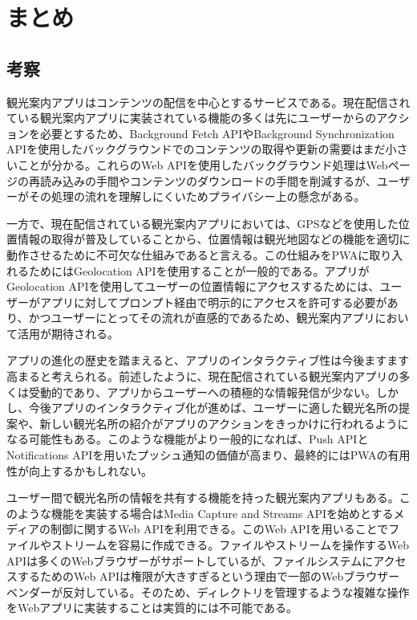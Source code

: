 \section{まとめ}
\label{section:まとめ}
\subsection{考察}
\label{subsection:考察}
観光案内アプリはコンテンツの配信を中心とするサービスである。現在配信されている観光案内アプリに実装されている機能の多くは先にユーザーからのアクションを必要とするため、Background Fetch APIやBackground Synchronization APIを使用したバックグラウンドでのコンテンツの取得や更新の需要はまだ小さいことが分かる。これらのWeb APIを使用したバックグラウンド処理はWebページの再読み込みの手間やコンテンツのダウンロードの手間を削減するが、ユーザーがその処理の流れを理解しにくいためプライバシー上の懸念がある。

一方で、現在配信されている観光案内アプリにおいては、GPSなどを使用した位置情報の取得が普及していることから、位置情報は観光地図などの機能を適切に動作させるために不可欠な仕組みであると言える。この仕組みをPWAに取り入れるためにはGeolocation APIを使用することが一般的である。アプリがGeolocation APIを使用してユーザーの位置情報にアクセスするためには、ユーザーがアプリに対してプロンプト経由で明示的にアクセスを許可する必要があり、かつユーザーにとってその流れが直感的であるため、観光案内アプリにおいて活用が期待される。

アプリの進化の歴史を踏まえると、アプリのインタラクティブ性は今後ますます高まると考えられる。前述したように、現在配信されている観光案内アプリの多くは受動的であり、アプリからユーザーへの積極的な情報発信が少ない。しかし、今後アプリのインタラクティブ化が進めば、ユーザーに適した観光名所の提案や、新しい観光名所の紹介がアプリのアクションをきっかけに行われるようになる可能性もある。このような機能がより一般的になれば、Push APIとNotifications APIを用いたプッシュ通知の価値が高まり、最終的にはPWAの有用性が向上するかもしれない。

ユーザー間で観光名所の情報を共有する機能を持った観光案内アプリもある。このような機能を実装する場合はMedia Capture and Streams APIを始めとするメディアの制御に関するWeb APIを利用できる。このWeb APIを用いることでファイルやストリームを容易に作成できる。ファイルやストリームを操作するWeb APIは多くのWebブラウザーがサポートしているが、ファイルシステムにアクセスするためのWeb APIは権限が大きすぎるという理由で一部のWebブラウザーベンダーが反対している。そのため、ディレクトリを管理するような複雑な操作をWebアプリに実装することは実質的には不可能である。

